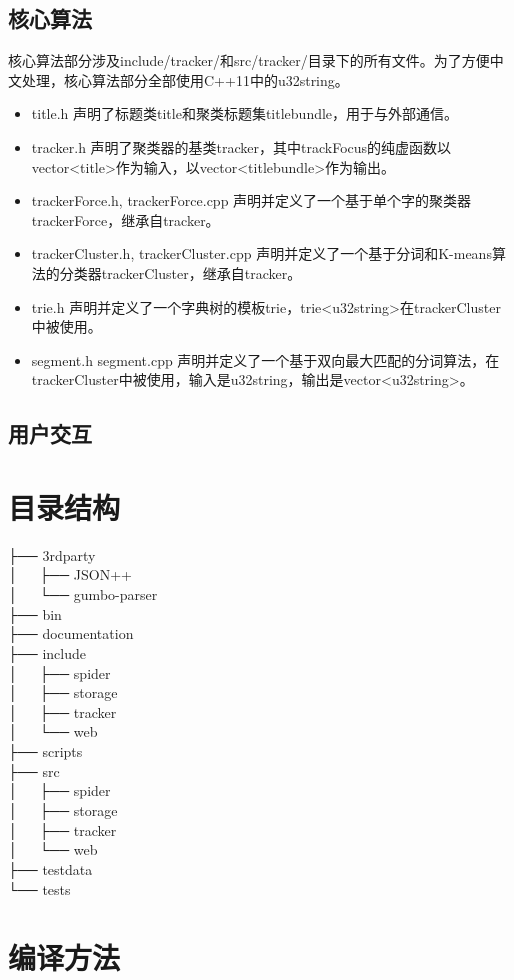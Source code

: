 \documentclass[12pt]{article}
\begin{document}
\subsection{核心算法}
核心算法部分涉及include/tracker/和src/tracker/目录下的所有文件。为了方便中文处理，核心算法部分全部使用C++11中的u32string。
\begin{itemize}
\item title.h 声明了标题类title和聚类标题集titlebundle，用于与外部通信。
\item tracker.h 声明了聚类器的基类tracker，其中trackFocus的纯虚函数以vector<title>作为输入，以vector<titlebundle>作为输出。
\item trackerForce.h, trackerForce.cpp 声明并定义了一个基于单个字的聚类器trackerForce，继承自tracker。
\item trackerCluster.h, trackerCluster.cpp 声明并定义了一个基于分词和K-means算法的分类器trackerCluster，继承自tracker。
\item trie.h 声明并定义了一个字典树的模板trie，trie<u32string>在trackerCluster中被使用。
\item segment.h segment.cpp 声明并定义了一个基于双向最大匹配的分词算法，在trackerCluster中被使用，输入是u32string，输出是vector<u32string>。

\end{itemize}

\subsection{用户交互}


\section{目录结构}
\noindent
├── 3rdparty\\
│\verb|   |├── JSON++\\
│\verb|   |└── gumbo-parser\\
├── bin\\
├── documentation\\
├── include\\
│\verb|   |├── spider\\
│\verb|   |├── storage\\
│\verb|   |├── tracker\\
│\verb|   |└── web\\
├── scripts\\
├── src\\
│\verb|   |├── spider\\
│\verb|   |├── storage\\
│\verb|   |├── tracker\\
│\verb|   |└── web\\
├── testdata\\
└── tests\\


\section{编译方法}

\end{document}

